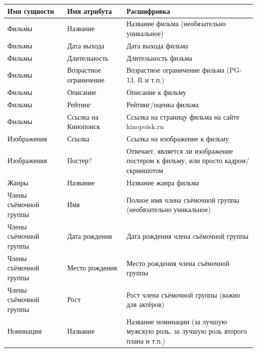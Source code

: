 \documentclass[a4paper,12pt]{article}
\renewcommand{\^}[2]{#1^{\, #2} \kern -1pt}
\newcommand{\1}{\kern 1pt}
\newcommand{\0}{\kern -1pt}
\begin{document}
	\begin{center}
		\begin{tabular}{|p{4cm}|p{4cm}|p{7cm}|}
			\hline
			\textbf{Имя сущности}	& \textbf{Имя атрибута} 	& \textbf{Расшифровка}	\\ \hline
			Фильмы	& Название	& Название фильма (необязательно уникальное)	\\ \hline
			Фильмы	& Дата выхода	& Дата выхода фильма	\\ \hline
			Фильмы	& Длительность	& Длительность фильма	\\ \hline
			Фильмы	& Возрастное ограничение	& Возрастное ограничение фильма (PG-13, R и т.п.)	\\ \hline
			Фильмы	& Описание	& Описание к фильму	\\ \hline
			Фильмы	& Рейтинг	& Рейтинг/оценка фильма	\\ \hline
			Фильмы	& Ссылка на Кинопоиск	& Ссылка на страницу фильма на сайте kinopoisk.ru	\\ \hline
			Изображения	& Ссылка	& Ссылка на изображение к фильму	\\ \hline
			Изображения	& Постер?	& Отвечает, является ли изображение постером к фильму, или просто кадром/скриншотом	\\ \hline
			Жанры	& Название	& Название жанра фильма	\\ \hline
			Члены съёмочной группы	& Имя	& Полное имя члена съёмочной группы (необязательно уникальное)	\\ \hline
			Члены съёмочной группы	& Дата рождения	& Дата рождения члена съёмочной группы	\\ \hline
			Члены съёмочной группы	& Место рождения	& Место рождения члена съёмочной группы	\\ \hline
			Члены съёмочной группы	& Рост	& Рост члена съёмочной группы (важно для актёров)	\\ \hline
			Номинации	& Название	& Название номинации (за лучшую мужскую роль, за лучшую роль второго плана и т.п.)	\\ \hline
		\end{tabular}
	\end{center}
\end{document}
